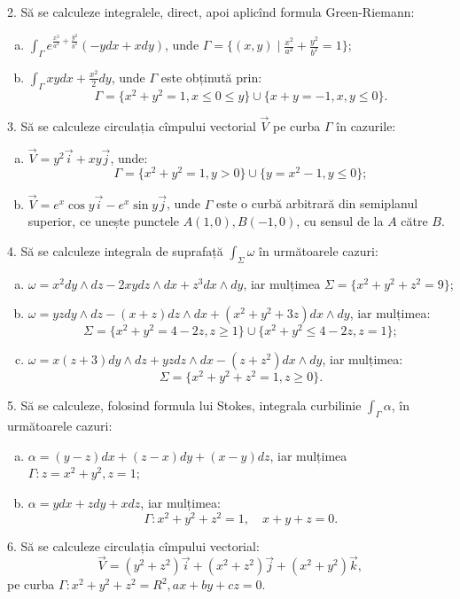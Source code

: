 \documentclass[11pt,a4paper]{article}
\newcommand\ds{\displaystyle}
\theoremstyle{dotless}
\theoremstyle{dotlessdr}
\begin{document}
\vspace{1cm}

2. Să se calculeze integralele, direct, apoi aplicînd formula Green-Riemann:
\begin{enumerate}[(a)]
\item $\ds\int_\Gamma e^{\frac{x^2}{a^2} + \frac{y^2}{b^2}} (-ydx + xdy)$, unde
  $\Gamma = \{(x, y) \mid \frac{x^2}{a^2} + \frac{y^2}{b^2} = 1 \}$;
\item $\ds\int_\Gamma xy dx + \frac{x^2}{2} dy$, unde $\Gamma$ este obținută prin:
  \[
    \Gamma = \{x^2 + y^2 = 1, x \leq 0 \leq y\} \cup \{x + y = -1, x,y \leq 0 \}.
  \]
\end{enumerate}

\vspace{1cm}

3. Să se calculeze circulația cîmpului vectorial $\vec{V}$ pe curba $\Gamma$ în
cazurile:
\begin{enumerate}[(a)]
\item $\vec{V} = y^2 \vec{i} + xy\vec{j}$, unde:
  \[
    \Gamma = \{x^2 + y^2 = 1, y > 0 \} \cup \{ y = x^2 - 1, y \leq 0 \};
  \]
\item $\vec{V} = e^x \cos y \vec{i} - e^x \sin y \vec{j}$, unde $\Gamma$ este
  o curbă arbitrară din semiplanul superior, ce unește punctele $A(1, 0), B(-1, 0)$,
  cu sensul de la $A$ către $B$.
\end{enumerate}

\vspace{1cm}

4. Să se calculeze integrala de suprafață $\int_\Sigma \omega$ în următoarele cazuri:
\begin{enumerate}[(a)]
\item $\omega = x^2 dy \wedge dz - 2xy dz \wedge dx + z^3 dx \wedge dy$, iar mulțimea
  $\Sigma = \{x^2 + y^2 + z^2 = 9 \}$;
\item $\omega = yz dy \wedge dz - (x + z) dz \wedge dx + (x^2 + y^2 + 3z) dx \wedge dy$,
  iar mulțimea:
  \[
    \Sigma = \{ x^2 + y^2 = 4 - 2z, z \geq 1 \} \cup \{x^2 + y^2 \leq 4 - 2z, z = 1 \};
  \]
\item $\omega = x(z + 3) dy \wedge dz + yz dz \wedge dx - (z + z^2) dx \wedge dy$,
  iar mulțimea:
  \[
    \Sigma = \{ x^2 + y^2 + z^2 = 1, z \geq 0\}.
  \]
\end{enumerate}

\vspace{1cm}

5. Să se calculeze, folosind formula lui Stokes, integrala curbilinie
$\int_\Gamma \alpha$, în următoarele cazuri:
\begin{enumerate}[(a)]
\item $\alpha = (y - z) dx + (z - x)dy + (x - y) dz$, iar mulțimea $\Gamma: z = x^2 + y^2, z = 1$;
\item $\alpha = ydx + zdy + xdz$, iar mulțimea:
  \[
    \Gamma: x^2 + y^2 + z^2 = 1, \quad x + y + z = 0.
  \]
\end{enumerate}

\vspace{1cm}

6. Să se calculeze circulația cîmpului vectorial:
\[
  \vec{V} = (y^2 + z^2)\vec{i} + (x^2 + z^2)\vec{j} + (x^2 + y^2)\vec{k},
\]
pe curba $\Gamma: x^2 + y^2 + z^2 = R^2, ax + by + cz = 0$.
\end{document}
